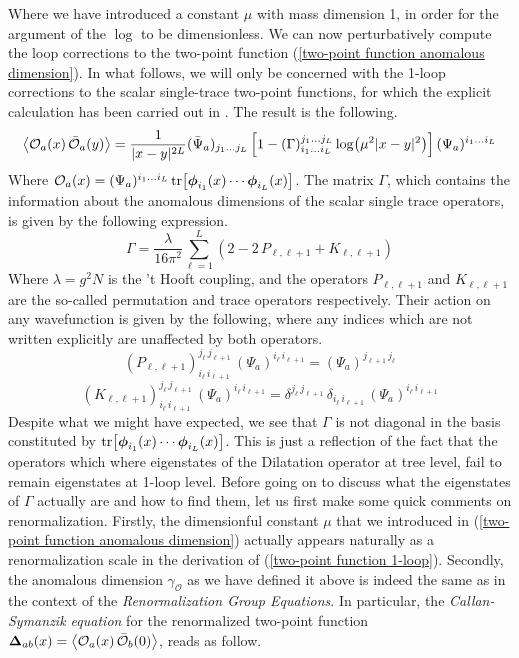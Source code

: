 %
%
Where we have introduced a constant $\mu$ with mass dimension 1, in order for the argument of the $\log$ to be dimensionless. We can now perturbatively compute the loop corrections to the two-point function (\ref{two-point function anomalous dimension}). In what follows, we will only be concerned with the 1-loop corrections to the scalar single-trace two-point functions, for which the explicit calculation has been carried out in \cite{Integrability Review}. The result is the following.
%
%
\begin{equation}\label{two-point function 1-loop}
\expval{\mathcal{O}_a(x) \, \bar{\mathcal{O}}_a(y)}
=
\frac{1}{|x-y|^{2L}}
(\bar{\Psi}_a)_{j_1 \ldots j_L}
\left[
1
-(\Gamma)^{j_1 \ldots j_L}_{i_1 \ldots i_L}
\log( \mu^2 |x-y|^2 )
\right]
(\Psi_a)^{i_1 \ldots i_L}
\end{equation}
%
%
Where $\mathcal{O}_a(x) = (\Psi_a)^{i_1 \ldots i_L} \tr[ \boldsymbol{\phi}_{i_1}(x) \cdots \boldsymbol{\phi}_{i_L}(x) ]$. The matrix $\Gamma$, which contains the information about the anomalous dimensions of the scalar single trace operators, is given by the following expression.
%
%
\begin{equation}\label{anomalous dimension operator}
\Gamma = \frac{\lambda}{16 \pi^2}\sum_{\ell=1}^L \left(
2 - 2 \, P_{\ell,\ell + 1} + K_{\ell,\ell + 1}
\right)
\end{equation}
%
%
Where $\lambda = g^2 N$ is the 't Hooft coupling, and the operators $P_{\ell,\ell + 1}$ and $K_{\ell,\ell + 1}$ are the so-called permutation and trace operators respectively. Their action on any wavefunction is given by the following, where any indices which are not written explicitly are unaffected by both operators.
%
%
\begin{equation}
(P_{\ell,\ell + 1})^{j_\ell \, j_{\ell+1}}
_{i_\ell \, i_{\ell+1}} \,
(\Psi_a)^{i_\ell \, i_{\ell+1}}
=
(\Psi_a)^{j_{\ell+1} \, j_\ell}
\end{equation}
%
%
\begin{equation}
(K_{\ell,\ell + 1})^{j_\ell \, j_{\ell+1}}
_{i_\ell \, i_{\ell+1}} \,
(\Psi_a)^{i_\ell \, i_{\ell+1}}
=
\delta^{j_\ell \, j_{\ell+1}} \, \delta_{i_\ell \, i_{\ell+1}} \, 
(\Psi_a)^{i_\ell \, i_{\ell+1}}
\end{equation}
%
%
Despite what we might have expected, we see that $\Gamma$ is not diagonal in the basis constituted by $\tr[ \boldsymbol{\phi}_{i_1}(x) \cdots \boldsymbol{\phi}_{i_L}(x) ]$. This is just a reflection of the fact that the operators which where eigenstates of the Dilatation operator at tree level, fail to remain eigenstates at 1-loop level. Before going on to discuss what the eigenstates of $\Gamma$ actually are and how to find them, let us first make some quick comments on renormalization. Firstly, the dimensionful constant $\mu$ that we introduced in (\ref{two-point function anomalous dimension}) actually appears naturally as a renormalization scale in the derivation of (\ref{two-point function 1-loop}). Secondly, the anomalous dimension $\gamma_{\mathcal{O}}$ as we have defined it above is indeed the same as in the context of the \textit{Renormalization Group Equations}. In particular, the \textit{Callan-Symanzik equation} for the renormalized two-point function $\mathbf{\Delta}_{ab}(x) = \expval{\mathcal{O}_a(x) \, \bar{\mathcal{O}}_b(0)}$, reads as follow.
